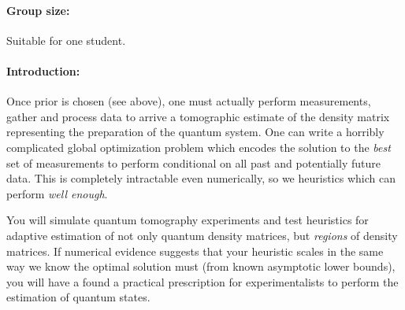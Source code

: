 \documentclass[aps,pra,onecolumn,nofootinbib,superscriptaddress,tightenlines,
notitlepage,12pt]{revtex4-1}
\begin{document}
\paragraph*{Group size:} Suitable for one student.

\paragraph*{Introduction:} Once prior is chosen (see above), one must actually perform measurements, gather and process data to arrive a tomographic estimate of the density matrix representing the preparation of the quantum system.  One can write a horribly complicated global optimization problem which encodes the solution to the \emph{best} set of measurements to perform conditional on all past and potentially future data.  This is completely intractable even numerically, so we heuristics which can perform \emph{well enough}.  

You will simulate quantum tomography experiments and test heuristics for adaptive estimation of not only quantum density matrices, but \emph{regions} of density matrices.  If numerical evidence suggests that your heuristic scales in the same way we know the optimal solution must (from known asymptotic lower bounds), you will have a found a practical prescription for experimentalists to perform the estimation of quantum states.



\end{document}
